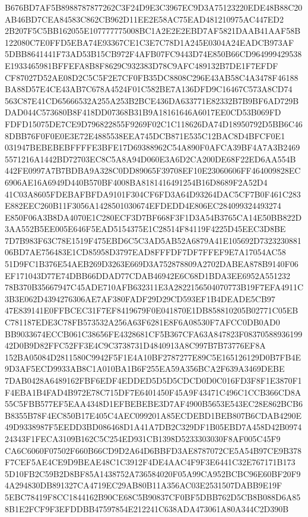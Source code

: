 \documentclass[UTF8,fontset=fandol,zihao=-4,a4paper]{ctexart}
\begin{document}
{{B676BD7AF5B8988787877262C3F24D9E3C3967EC9D3A75123220EDE48B88C20AB46BD7CEA84583C862CB962D11EE2E58AC75EAD481210975AC447ED2
2B207F5C5BB162055E107777775008BC1A2E2E2EBD7AF5821DAAB41AAF58B122080C7E0FFD5EBA74E93367CE1C3E7C78D1A245E0304A24EADCB973AF
5DBB8641441F73AD53B15CB972F4AFB07FC9443D74E850B66CD964999429538E1933465981BFFEFA8B8F8629C932383D78C9AFC489132B7DE1F7EFDF
CF87027D52AE08D2C5C5F2E7CF0FB35DC8808C296E43AB58C4A3478F46188BA88D57E4CE43AB7C678A4524F01C582BE7A136DFD9C16467C573A8CD74
563C87E41CD65666532A255A253B2BCE436DA633771E82332B7B9BF6AD729BDAD044C573680B8F418DD07368B31B9A18161646A6017EE0CD53B069FD
FDFD15075DE7CE9D796822855F9269F02C1C118626DA74D18950792D5BB6C468DBB76F0F0E0E3E72E4885538EEA745DCB871E535C12BAC8D4BFCF0E1
031947BEBEBEBFFFFE3BFE17D69388962C54A890F0AFCA39BF4A7A3B24695571216A1442BD72703EC8C5A8A94D060E3A6D2CA200DE68F22ED6AA554B
442FE0997A7B7BDBA9A328C0DD89065F39708EF10E23060606FF464009828EC6906AE16A6949D440B570BF4008BA8181416491254B16D8689F2A52D4
41C03A8605FDEBAFBFDA9101F304CF6FD3A64D93264DAC5CF7B0F461C283E882EEC260B11F3056A1428501030674EFDEDD4E806EC284099324493274
E850F06A3B8DA4070E1C280ECF3D7BF668F3F1D3A54B3765CA14E50BB822D3AA552B5EE005E646F5EAD5154375E1C28514F84119F4225D45EEC3D8BE
7D7B983F63C78E1519F475EBD6C5C3AD5AB52A6879A41E105692D732323088106BD7AE756483E1CD85958D3797EAD8FFFDF7DF7FFEF9E7A17054AC58
51D9FC1B376E54AEB269D3263E669D3A752878809A2702DABEA878B9140F06EF171043D77E74DBB66DDAD77CDAB46942E6C68D1BDA3EE6952A551232
78B370B35667947C45ADE710AFB632311E3A2822156504070773B19F7EFA4911C3B3E062D4394276306AE7AF380FADF29D29CD593EF1B4DEADE5CB97
47E839141E0FFBCEC31F7EF8419679F0E041870E1DB858810205B02771C05EBC781187EDE3C78FB573532A256A63F6281E8F6A08530F7AFCC0DB0AD0
BB9033674ECCB061C38656FE4328681CF5B367CFA63A847823F0837058893619942D0B9D82FFC52FF3E4C9C3738731D4840913A8C997B7B73776EF8A
152BA05084D2811580C9942F5F1E4A10BF2787277E89C5E165126129D0B7FB4E9D3AF5ECD9933AB8C1A010BA1B6F255EA59A356BCA2F639A3469DEBE
7DAB0428A6489162FBF6EDF4EDDED5D5D5CDCD0D0C016FD3F8F1E3870F1F4EBA1B4FAD4B972E78C715DF7E6401450F45A9F43471C496C1CCB366CD8A
55C5FBB577EF5EAA4348D1EFBEBEBE3D7AF4900B5653E543EC28E862BCB6B8355B78F4EC850B17E405C4AEC099201A85ECDEBD1BEB807B6CDAB4290E
49D9338987F5EEDD3BD086468D1A41A7DB2C329DF1B05EBD7A458D42B097424343F1FECA3109B162C5C254ED931CB1398D5233303030F8AF005C45F9
CA6C6060F07502F660B66CD9D2A64D6BBFD3AE8787072CE5A54B97CE9B378F7CEF5AE4CE9D9BEAE48C1C3912F4DE4AAC4F9F3E6441C32E767171B173
5D10FB2C59B2D8BF85A1438752A736584020F05A99CA952BCBC96E60BF20F94A294830DB891327CA4719EC29AB80B11A356AC03E2531507DABB9E19F
5EBC78419F8CC1844162B90CE68C5B90837CF0BF5DBB762D5CB8B088D6A858B1E2FCF9F3EFDDBB47597854E212241C638ADA473061A80A344C2D390B
}}
\end{document}
